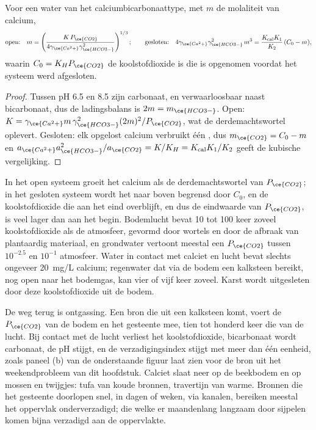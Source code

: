 \begin{theorem}\label{thm:b3:water-rock-interaction:calcite}
Voor een water van het calciumbicarbonaattype, met $m$ de molaliteit van calcium,
\[
\text{open:}\quad m = \left(\frac{K\,P_{\ce{CO2}}}{4\gamma_{\ce{Ca^2+}}
\gamma_{\ce{HCO3-}}^2}\right)^{1/3};
\qquad
\text{gesloten:}\quad 4\gamma_{\ce{Ca^2+}}\gamma_{\ce{HCO3-}}^2\,m^3 =
\frac{K_{\mathrm{cal}}K_1}{K_2}\,(C_0 - m),
\]
waarin $C_0 = K_H P_{\ce{CO2}}$ de koolstofdioxide is die is opgenomen voordat het
systeem werd afgesloten.
\end{theorem}

\begin{proof}
Tussen pH 6.5 en 8.5 zijn carbonaat,  en  verwaarloosbaar naast
bicarbonaat, dus de ladingsbalans is $2m = m_{\ce{HCO3-}}$. Open: $K = \gamma
_{\ce{Ca^2+}}m\,\gamma_{\ce{HCO3-}}^2(2m)^2/P_{\ce{CO2}}$, wat de
derdemachtswortel oplevert. Gesloten: elk opgelost calcium verbruikt één , dus $m_{\ce{CO2}}
= C_0 - m$ en $a_{\ce{Ca^2+}}a_{\ce{HCO3-}}^2/a_{\ce{CO2}} = K/K_H =
K_{\mathrm{cal}}K_1/K_2$ geeft de kubische vergelijking.
\end{proof}

In het open systeem groeit het calcium als de derdemachtswortel van $P_{\ce{CO2}}$; in
het gesloten systeem wordt het naar boven begrensd door $C_0$, en de koolstofdioxide die
aan het eind overblijft, en dus de eindwaarde van $P_{\ce{CO2}}$, is veel lager dan aan het begin. Bodemlucht
bevat 10 tot 100 keer zoveel koolstofdioxide als de atmosfeer, gevormd door wortels
en door de afbraak van plantaardig materiaal, en grondwater vertoont meestal
een $P_{\ce{CO2}}$ tussen $10^{-2.5}$ en $10^{-1}$ atmosfeer. Water in contact
met calciet en lucht bevat slechts ongeveer \qty{20}{mg/L} calcium; regenwater dat
via de bodem een kalksteen bereikt, nog open naar het bodemgas, kan
vier of vijf keer zoveel. Karst wordt uitgesleten door deze koolstofdioxide uit de bodem.

De weg terug is ontgassing. Een bron die uit een kalksteen komt, voert
de $P_{\ce{CO2}}$ van de bodem en het gesteente mee, tien tot honderd keer die van
de lucht. Bij contact met de lucht verliest het koolstofdioxide, bicarbonaat wordt
carbonaat, de pH stijgt, en de verzadigingsindex stijgt met meer dan één eenheid,
zoals paneel (b) van de onderstaande figuur laat zien voor de bron uit het
weekendprobleem van dit hoofdstuk.
Calciet slaat neer op de beekbodem en op mossen en twijgjes: tufa van
koude bronnen, travertijn van warme. Bronnen die het gesteente doorlopen
snel, in dagen of weken, via kanalen, bereiken meestal het oppervlak
onderverzadigd; die welke er maandenlang langzaam door sijpelen
komen bijna verzadigd aan de oppervlakte.

